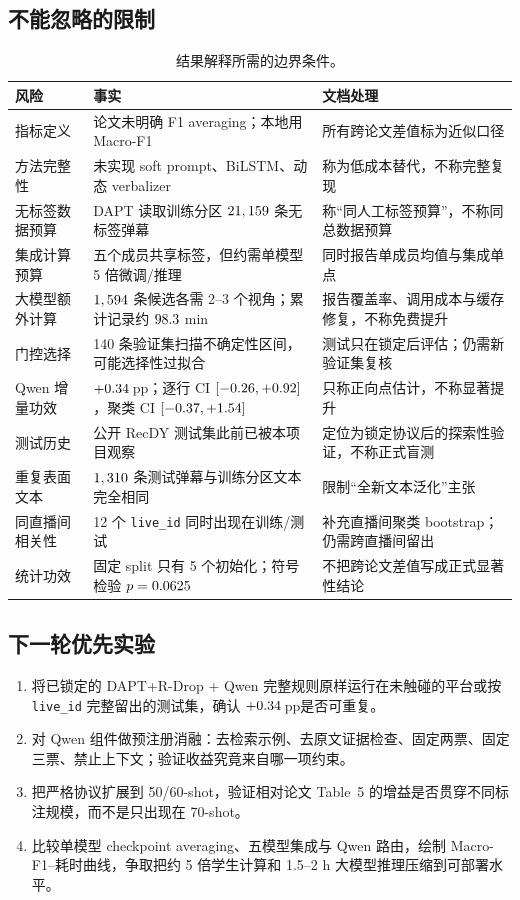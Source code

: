 \documentclass[UTF8,zihao=-4,a4paper]{ctexart}
\newcommand{\pp}{\,pp}
\begin{document}
\subsection{不能忽略的限制}
\begin{table}[H]
\centering
\small
\caption{结果解释所需的边界条件。}
\label{tab:limitations}
\begin{tabularx}{\textwidth}{p{2.5cm}X X}
\toprule
风险 & 事实 & 文档处理 \\
\midrule
指标定义 & 论文未明确 F1 averaging；本地用 Macro-F1 & 所有跨论文差值标为近似口径 \\
方法完整性 & 未实现 soft prompt、BiLSTM、动态 verbalizer & 称为低成本替代，不称完整复现 \\
无标签数据预算 & DAPT 读取训练分区 $21,159$ 条无标签弹幕 & 称“同人工标签预算”，不称同总数据预算 \\
集成计算预算 & 五个成员共享标签，但约需单模型 5 倍微调/推理 & 同时报告单成员均值与集成单点 \\
大模型额外计算 & $1,594$ 条候选各需 2--3 个视角；累计记录约 $98.3$ min & 报告覆盖率、调用成本与缓存修复，不称免费提升 \\
门控选择 & 140 条验证集扫描不确定性区间，可能选择性过拟合 & 测试只在锁定后评估；仍需新验证集复核 \\
Qwen 增量功效 & $+0.34$\pp；逐行 CI $[-0.26,+0.92]$，聚类 CI $[-0.37,+1.54]$ & 只称正向点估计，不称显著提升 \\
测试历史 & 公开 RecDY 测试集此前已被本项目观察 & 定位为锁定协议后的探索性验证，不称正式盲测 \\
重复表面文本 & $1,310$ 条测试弹幕与训练分区文本完全相同 & 限制“全新文本泛化”主张 \\
同直播间相关性 & 12 个 \texttt{live\_id} 同时出现在训练/测试 & 补充直播间聚类 bootstrap；仍需跨直播间留出 \\
统计功效 & 固定 split 只有 5 个初始化；符号检验 $p=0.0625$ & 不把跨论文差值写成正式显著性结论 \\
\bottomrule
\end{tabularx}
\end{table}

\subsection{下一轮优先实验}
\begin{enumerate}[leftmargin=2.2em,itemsep=0.35em]
  \item 将已锁定的 DAPT+R-Drop + Qwen 完整规则原样运行在未触碰的平台或按 \texttt{live\_id} 完整留出的测试集，确认 $+0.34$\pp 是否可重复。
  \item 对 Qwen 组件做预注册消融：去检索示例、去原文证据检查、固定两票、固定三票、禁止上下文；验证收益究竟来自哪一项约束。
  \item 把严格协议扩展到 50/60-shot，验证相对论文 Table~5 的增益是否贯穿不同标注规模，而不是只出现在 70-shot。
  \item 比较单模型 checkpoint averaging、五模型集成与 Qwen 路由，绘制 Macro-F1--耗时曲线，争取把约 5 倍学生计算和 1.5--2 h 大模型推理压缩到可部署水平。
\end{enumerate}
\end{document}
